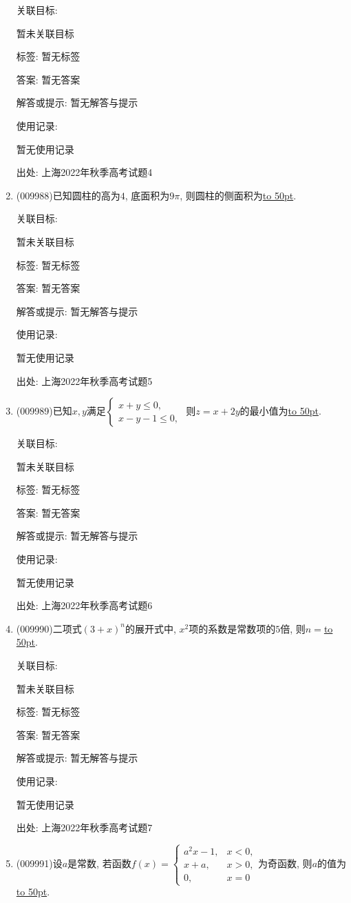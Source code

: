 \documentclass[10pt,a4paper]{article}
\newcommand{\blank}[1]{\underline{\hbox to #1pt{}}}
\begin{document}
\begin{enumerate}[1.]
关联目标:

暂未关联目标



标签: 暂无标签

答案: 暂无答案

解答或提示: 暂无解答与提示

使用记录:

暂无使用记录


出处: 上海2022年秋季高考试题4
\item { (009988)}已知圆柱的高为$4$, 底面积为$9\pi$, 则圆柱的侧面积为\blank{50}.


关联目标:

暂未关联目标



标签: 暂无标签

答案: 暂无答案

解答或提示: 暂无解答与提示

使用记录:

暂无使用记录


出处: 上海2022年秋季高考试题5
\item { (009989)}已知$x,y$满足$\begin{cases}x+y\le 0, \\ x-y-1\le 0,\end{cases}$ 则$z=x+2y$的最小值为\blank{50}.


关联目标:

暂未关联目标



标签: 暂无标签

答案: 暂无答案

解答或提示: 暂无解答与提示

使用记录:

暂无使用记录


出处: 上海2022年秋季高考试题6
\item { (009990)}二项式$(3+x)^n$的展开式中, $x^2$项的系数是常数项的$5$倍, 则$n=$\blank{50}.


关联目标:

暂未关联目标



标签: 暂无标签

答案: 暂无答案

解答或提示: 暂无解答与提示

使用记录:

暂无使用记录


出处: 上海2022年秋季高考试题7
\item { (009991)}设$a$是常数, 若函数$f(x)=\begin{cases} a^2x-1, & x<0, \\ x+a, & x>0, \\ 0, & x=0 \end{cases}$为奇函数, 则$a$的值为\blank{50}.



\end{enumerate}
\end{document}
